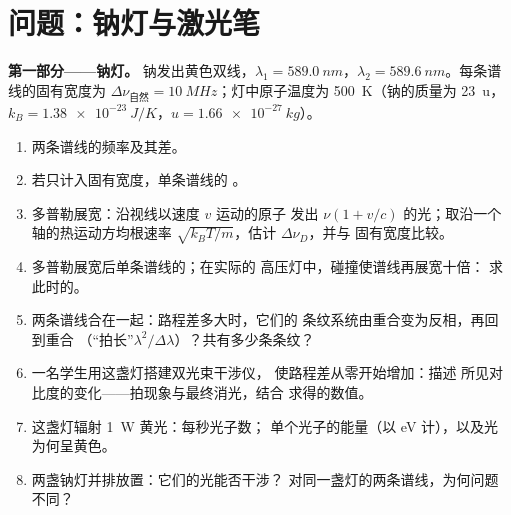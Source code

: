 \section{问题：钠灯与激光笔}

\begin{problem}
\label{pb:b2:scalar-light-model:1}

\medskip
\noindent\textbf{第一部分——钠灯。}
钠发出黄色双线，$\lambda_1 = \qty{589.0}{nm}$，$\lambda_2 =
\qty{589.6}{nm}$。每条谱线的固有宽度为 $\Delta\nu_{\text{自然}} =
\qty{10}{MHz}$；灯中原子温度为 \qty{500}{K}（钠的质量为
\qty{23}{u}，$k_B = \qty{1.38e-23}{J/K}$，$u = \qty{1.66e-27}{kg}$）。
\begin{enumerate}
  \item 两条谱线的频率及其差。
  \item 若只计入固有宽度，单条谱线的
        。
  \item 多普勒展宽：沿视线以速度 $v$ 运动的原子
        发出 $\nu(1 + v/c)$ 的光；取沿一个轴的热运动方均根速率 $\sqrt{k_BT
        /m}$，估计 $\Delta\nu_D$，并与
        固有宽度比较。
  \item 多普勒展宽后单条谱线的；在实际的
        高压灯中，碰撞使谱线再展宽十倍：
        求此时的。
  \item 两条谱线合在一起：路程差多大时，它们的
        条纹系统由重合变为反相，再回到重合
        （“拍长”$\lambda^2/\Delta\lambda$）？共有多少条条纹？
  \item 一名学生用这盏灯搭建双光束干涉仪，
        使路程差从零开始增加：描述
        所见对比度的变化——拍现象与最终消光，结合
        求得的数值。
  \item 这盏灯辐射 \qty{1}{W} 黄光：每秒光子数；
        单个光子的能量（以 eV 计），以及光为何呈黄色。
  \item 两盏钠灯并排放置：它们的光能否干涉？
        对同一盏灯的两条谱线，为何问题不同？
\end{enumerate}


\end{problem}
